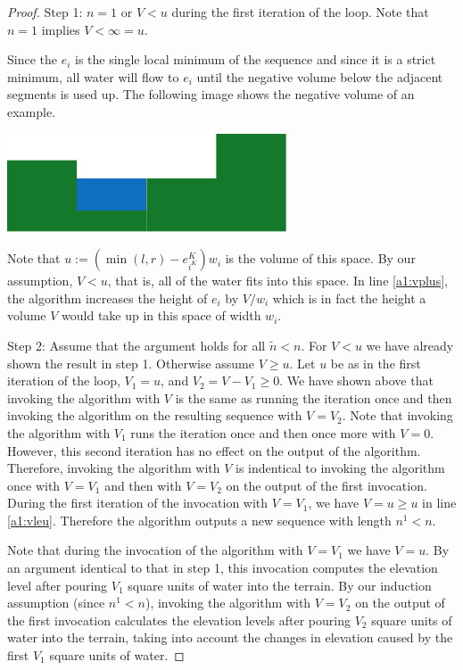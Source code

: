 \documentclass[11pt,a4paper]{article}
\begin{document}
\begin{proof}
Step 1: $n = 1$ or $V < u$ during the first iteration of the loop. Note that $n = 1$ implies $V < \infty = u$.

Since the $e_i$ is the single local minimum of the sequence and since it is a strict minimum, all water will flow to $e_i$ until the negative volume below the adjacent segments is used up.
The following image shows the negative volume of an example.
\begin{center}
  \includegraphics{im6.pdf}
\end{center}
Note that $u := (\min(l, r)-e_{i^K}^K)w_i$ is the volume of this space.
By our assumption, $V < u$, that is, all of the water fits into this space.
In line \ref{a1:vplus}, the algorithm increases the height of $e_i$ by $V/w_i$ which is in fact the height a volume $V$ would take up in this space of width $w_i$.

Step 2: Assume that the argument holds for all $\tilde{n} < n$.
For $V < u$ we have already shown the result in step 1.
Otherwise assume $V \ge u$.
Let $u$ be as in the first iteration of the loop, $V_1 = u$, and $V_2 = V - V_1 \ge 0$.
We have shown above that invoking the algorithm with $V$ is the same as running the iteration once and then invoking the algorithm on the resulting sequence with $V = V_2$.
Note that invoking the algorithm with $V_1$ runs the iteration once and then once more with $V = 0$.
However, this second iteration has no effect on the output of the algorithm.
Therefore, invoking the algorithm with $V$ is indentical to invoking the algorithm once with $V = V_1$ and then with $V = V_2$ on the output of the first invocation.
During the first iteration of the invocation with $V = V_1$, we have $V = u \ge u$ in line \ref{a1:vleu}.
Therefore the algorithm outputs a new sequence with length $n^1 < n$.

Note that during the invocation of the algorithm with $V = V_1$ we have $V = u$.
By an argument identical to that in step 1, this invocation computes the elevation level after pouring $V_1$ square units of water into the terrain.
By our induction assumption (since $n^1 < n$), invoking the algorithm with $V = V_2$ on the output of the first invocation calculates the elevation levels after pouring $V_2$ square units of water into the terrain, taking into account the changes in elevation caused by the first $V_1$ square units of water.


\end{proof}
\end{document}
